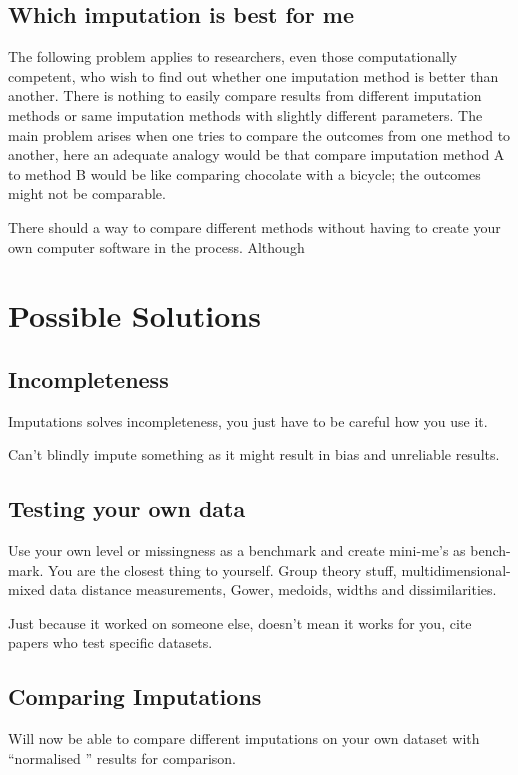 \documentclass{IEEEconf}
\begin{document}
		\subsection{Which imputation is best for me} %
		\label{sub:which_imputation_is_best_for_me}
			The following problem applies to researchers, even those computationally competent, who wish to find out whether one imputation method is better than another. There is nothing to easily compare results from different imputation methods or same imputation methods with slightly different parameters. The main problem arises when one tries to compare the outcomes from one method to another, here an adequate analogy would be that compare imputation method A to method B would be like comparing chocolate with a bicycle; the outcomes might not be comparable. 

			There should a way to compare different methods without having to create your own computer software in the process. Although 

	\section{Possible Solutions} %
	\label{sec:a_solution}
		\subsection{Incompleteness} %
		\label{sub:incompleteness}
		Imputations solves incompleteness, you just have to be careful how you use it. 

		Can't blindly impute something as it might result in bias and unreliable results. 
		\subsection{Testing your own data} %
		\label{sub:testing_your_own_data}
		Use your own level or missingness as a benchmark and create mini-me's as bench-mark. You are the closest thing to yourself. 
		Group theory stuff, multidimensional-mixed data distance measurements, Gower, medoids, widths and dissimilarities.

		Just because it worked on someone else, doesn't mean it works for you, cite papers who test specific datasets. 
		\subsection{Comparing Imputations} %
		\label{sub:comparing_imputations}
		Will now be able to compare different imputations on your own dataset with ``normalised '' results for comparison. 
\end{document}
